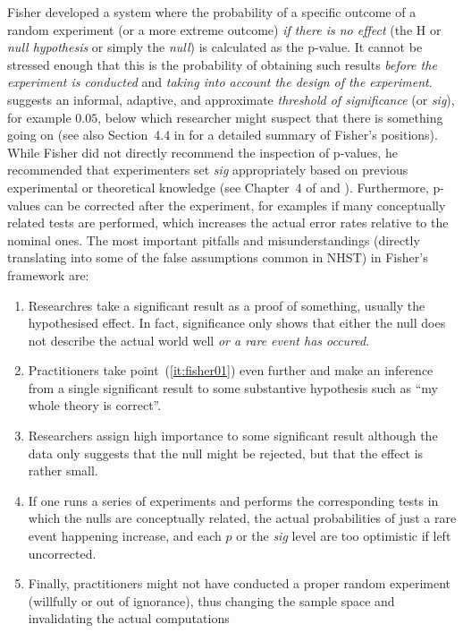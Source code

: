 Fisher developed a system where the probability of a specific outcome of a random experiment (or a more extreme outcome) \textit{if there is no effect} (the H or \textit{null hypothesis} or simply the \textit{null}) is calculated as the p-value.
It cannot be stressed enough that this is the probability of obtaining such results \textit{before the experiment is conducted} and \textit{taking into account the design of the experiment}.
\textcite[504]{Fisher1926} suggests an informal, adaptive, and approximate \textit{threshold of significance} (or \textit{sig}), for example $0.05$, below which researcher might suspect that there is something going on (see also Section~4.4 in \citealt{Lehmann2011} for a detailed summary of Fisher's positions).
While Fisher did not directly recommend the inspection of p-values, he recommended that experimenters set \textit{sig} appropriately based on previous experimental or theoretical knowledge (see Chapter~4 of \citealt{Lehmann2011} and \citealt{Perezgonzalez2015}).
Furthermore, p-values can be corrected after the experiment, for examples if many conceptually related tests are performed, which increases the actual error rates relative to the nominal ones.
The most important pitfalls and misunderstandings (directly translating into some of the false assumptions common in NHST) in Fisher's framework are:

\vspace{\baselineskip}
\begin{enumerate}
  \item \label{it:fisher01} Researchres take a significant result as a proof of something, usually the hypothesised effect.
    In fact, significance only shows that either the null does not describe the actual world well \textit{or a rare event has occured}.
  \item \label{it:fisher02} Practitioners take point~(\ref{it:fisher01}) even further and make an inference from a single significant result to some substantive hypothesis such as ``my whole theory is correct''.
  \item \label{it:fisher03} Researchers assign high importance to some significant result although the data only suggests that the null might be rejected, but that the effect is rather small.
  \item \label{it:fisher04} If one runs a series of experiments and performs the corresponding tests in which the nulls are conceptually related, the actual probabilities of just a rare event happening increase, and each $p$ or the \textit{sig} level are too optimistic if left uncorrected.
  \item \label{it:fisher05} Finally, practitioners might not have conducted a proper random experiment (willfully or out of ignorance), thus changing the sample space and invalidating the actual computations
\end{enumerate}
\vspace{\baselineskip}

